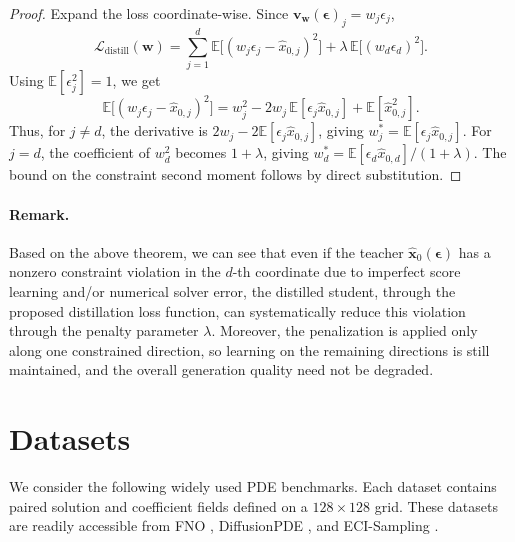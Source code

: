 \documentclass{article}
\theoremstyle{plain}
\theoremstyle{definition}
\theoremstyle{remark}
\begin{document}
\begin{proof}
Expand the loss coordinate-wise. Since \(\bm{v}_{\bm{w}}(\bm{\epsilon})_j = w_j\epsilon_j\),
\[
\mathcal{L}_{\mathrm{distill}}(\bm{w})
=
\sum_{j=1}^d
\mathbb{E}\bigl[(w_j\epsilon_j-\widehat{x}_{0,j})^2\bigr]
+
\lambda\,\mathbb{E}\bigl[(w_d\epsilon_d)^2\bigr].
\]
Using \(\mathbb{E}[\epsilon_j^2]=1\), we get
\[
\mathbb{E}\bigl[(w_j\epsilon_j-\widehat{x}_{0,j})^2\bigr]
=
w_j^2 - 2w_j\,\mathbb{E}[\epsilon_j\widehat{x}_{0,j}] + \mathbb{E}[\widehat{x}_{0,j}^2].
\]
Thus, for \(j\neq d\), the derivative is \(2w_j-2\mathbb{E}[\epsilon_j\widehat{x}_{0,j}]\), giving
\(w_j^*=\mathbb{E}[\epsilon_j\widehat{x}_{0,j}]\).
For \(j=d\), the coefficient of \(w_d^2\) becomes \(1+\lambda\), giving
\(w_d^*=\mathbb{E}[\epsilon_d\widehat{x}_{0,d}]/(1+\lambda)\).
The bound on the constraint second moment follows by direct substitution.
\end{proof}

\paragraph{Remark.} Based on the above theorem, we can see that even if the teacher \(\widehat{\bm{x}}_0(\bm{\epsilon})\) has a nonzero constraint violation in the \(d\)-th coordinate due to imperfect score learning and/or numerical solver error, the distilled student, through the proposed distillation loss function, can systematically reduce this violation through the penalty parameter \(\lambda\). Moreover, the penalization is applied only along one constrained direction, so learning on the remaining directions is still maintained, and the overall generation quality need not be degraded.








\section{Datasets}\label{appendix:datasets}
We consider the following widely used PDE benchmarks. Each dataset contains paired solution and coefficient fields defined on a $128 \times 128$ grid. These datasets are readily accessible from FNO \cite{li2020fno}, DiffusionPDE \cite{huang2024diffusionpde}, and ECI-Sampling \cite{cheng2025eci}.
\end{document}
